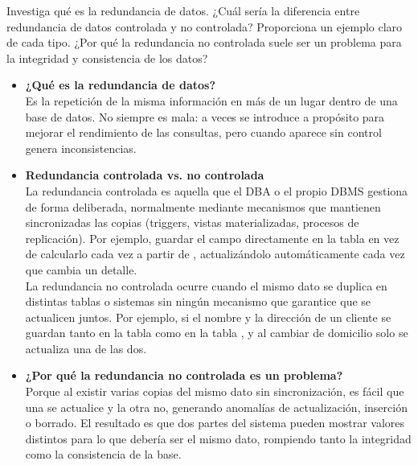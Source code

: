 \item Investiga qué es la redundancia de datos. ¿Cuál sería la diferencia entre redundancia de datos controlada y no controlada? Proporciona un ejemplo claro de cada tipo. ¿Por qué la redundancia no controlada suele ser un problema para la integridad y consistencia de los datos?

\begin{itemize}
	\item \textbf{¿Qué es la redundancia de datos?}\\
	      Es la repetición de la misma información en más de un lugar dentro de una base de datos. No siempre es mala: a veces se introduce a propósito para mejorar el rendimiento de las consultas, pero cuando aparece sin control genera inconsistencias.
 
	\item \textbf{Redundancia controlada vs. no controlada}\\
	      La redundancia controlada es aquella que el DBA o el propio DBMS gestiona de forma deliberada, normalmente mediante mecanismos que mantienen sincronizadas las copias (triggers, vistas materializadas, procesos de replicación). Por ejemplo, guardar el campo  directamente en la tabla  en vez de calcularlo cada vez a partir de , actualizándolo automáticamente cada vez que cambia un detalle.\\
	      La redundancia no controlada ocurre cuando el mismo dato se duplica en distintas tablas o sistemas sin ningún mecanismo que garantice que se actualicen juntos. Por ejemplo, si el nombre y la dirección de un cliente se guardan tanto en la tabla  como en la tabla , y al cambiar de domicilio solo se actualiza una de las dos.
 
	\item \textbf{¿Por qué la redundancia no controlada es un problema?}\\
	      Porque al existir varias copias del mismo dato sin sincronización, es fácil que una se actualice y la otra no, generando anomalías de actualización, inserción o borrado. El resultado es que dos partes del sistema pueden mostrar valores distintos para lo que debería ser el mismo dato, rompiendo tanto la integridad como la consistencia de la base.
\end{itemize}
